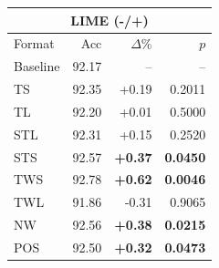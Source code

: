 \begin{tabular}{lrrr}
\toprule
\multicolumn{4}{c}{\textbf{LIME (-/+)}} \\
\midrule
Format & Acc & $\Delta$\% & $p$ \\
\midrule
Baseline & 92.17 & -- & -- \\
\midrule
TS & 92.35 & +0.19 & 0.2011 \\
TL & 92.20 & +0.01 & 0.5000 \\
STL & 92.31 & +0.15 & 0.2520 \\
STS & 92.57 & \textbf{+0.37} & \textbf{0.0450} \\
TWS & 92.78 & \textbf{+0.62} & \textbf{0.0046} \\
TWL & 91.86 & -0.31 & 0.9065 \\
NW & 92.56 & \textbf{+0.38} & \textbf{0.0215} \\
POS & 92.50 & \textbf{+0.32} & \textbf{0.0473} \\
\bottomrule
\end{tabular}